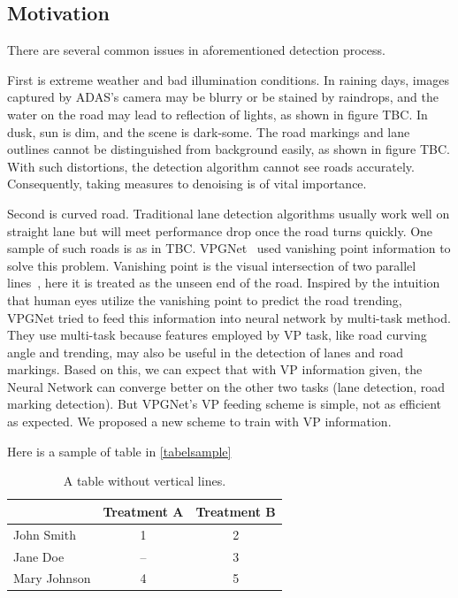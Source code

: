 \begin{spacing}{1.5}
\section{Motivation}

There are several common issues in aforementioned detection process. 

First is extreme weather and bad illumination conditions. In raining days, images captured by ADAS’s camera may be blurry or be stained by raindrops, and the water on the road may lead to reflection of lights, as shown in figure TBC. In dusk, sun is dim, and the scene is dark-some. The road markings and lane outlines cannot be distinguished from background easily, as shown in figure TBC. With such distortions, the detection algorithm cannot see roads accurately. Consequently, taking measures to denoising is of vital importance. 

Second is curved road. Traditional lane detection algorithms usually work well on straight lane but will meet performance drop once the road turns quickly. One sample of such roads is as in TBC. VPGNet~\cite{lee2017vpgnet} used vanishing point information to solve this problem. Vanishing point is the visual intersection of two parallel lines~\cite{barnard1983interpreting}, here it is treated as the unseen end of the road.  Inspired by the intuition that human eyes utilize the vanishing point to predict the road trending, VPGNet tried to feed this information into neural network by multi-task method. They use multi-task because features employed by VP task, like road curving angle and trending, may also be useful in the detection of lanes and road markings. Based on this, we can expect that with VP information given, the Neural Network can converge better on the other two tasks (lane detection, road marking detection). But VPGNet’s VP feeding scheme is simple, not as efficient as expected. We proposed a new scheme to train with VP information.


Here is a sample of table in \autoref{tabelsample}

\begin{table}[ht]
\centering
\caption{A table without vertical lines.}
\label{tabelsample}
\begin{tabular}[t]{lcc}
\hline
&Treatment A&Treatment B\\
\hline
John Smith&1&2\\
Jane Doe&--&3\\
Mary Johnson&4&5\\
\hline
\end{tabular}
\end{table}%


\end{spacing}
